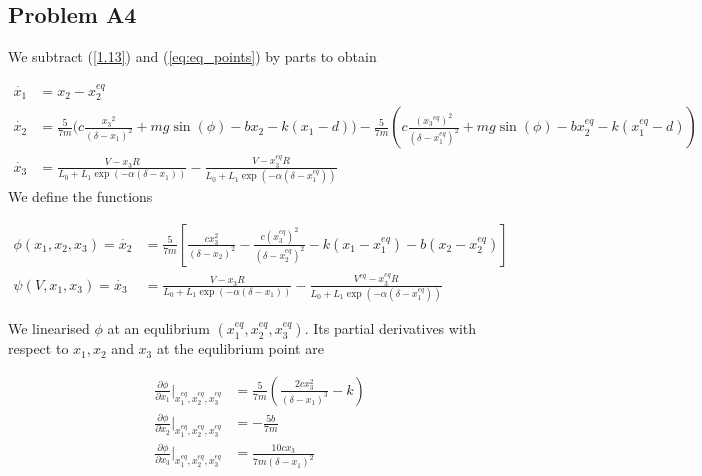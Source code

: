 \documentclass[a4paper,10pt,reqno]{amsart}
\numberwithin{equation}{section}
\begin{document}
\subsection{Problem A4}\label{sec:a4}
We subtract (\ref{1.13}) and (\ref{eq:eq_points}) by parts to obtain

\begin{subequations}
     \begin{align}
          \dot{x_1} &= x_2 - x_2^{eq} \\
          \dot{x_2} &=  \frac{5}{7m}\bigg(c \frac{{x_3}^2}{(\delta - x_1)^2} + mg\sin(\phi) - bx_2 - k(x_1-d)\bigg) - \frac{5}{7m}\left(c \frac{({x_3}^{eq})^2}{(\delta - x_1^{eq})^2} + mg\sin(\phi) - bx_2^{eq} - k(x_1^{eq}-d)\right) \label{eq:x2dot}\\
          \dot{x_3} &= \frac{V - x_3R}{L_0 + L_1\exp(-\alpha(\delta - x_1))} - \frac{V - x_3^{eq}R}{L_0 + L_1\exp(-\alpha(\delta - x_1^{eq}))} \label{eq:x3dot}
     \end{align}
\end{subequations}\newline
We define the functions

\begin{subequations}
    \begin{align}
         \phi(x_1, x_2, x_3) = \dot{x_2} &= \frac{5}{7m}\left[\frac{cx_3^2}{(\delta - x_2)^2} - \frac{c(x_3^{eq})^2}{(\delta - x_2^{eq})^2} - k(x_1 - x_1^{eq}) - b(x_2 - x_2^{eq})\right] \\
         \psi(V, x_1, x_3) = \dot{x_3} &= \frac{V - x_3R}{L_0 + L_1\exp(-\alpha(\delta - x_1))} - \frac{V^{eq} - x_3^{eq}R}{L_0 + L_1\exp(-\alpha(\delta - x_1^{eq}))}
    \end{align}
\end{subequations}

We linearised $\phi$ at an equlibrium $(x_1^{eq}, x_2^{eq}, x_3^{eq})$. Its partial derivatives with respect to $x_1, x_2$ and $x_3$ at the equlibrium point are

\begin{subequations}
     \begin{align}
          \frac{\partial\phi}{\partial x_1}\Bigg|_{x_1^{eq}, x_2^{eq}, x_3^{eq}} &= \frac{5}{7 m}\left(\frac{2 c x_{3}^{2}}{\left(\delta - x_{1}\right)^{3}} - k\right) \\
          \frac{\partial\phi}{\partial x_2}\Bigg|_{x_1^{eq}, x_2^{eq}, x_3^{eq}} &= - \frac{5 b}{7 m} \\
          \frac{\partial\phi}{\partial x_3}\Bigg|_{x_1^{eq}, x_2^{eq}, x_3^{eq}} &= \frac{10 c x_{3}}{7 m \left(\delta - x_{1}\right)^{2}}
     \end{align}
\end{subequations}
\end{document}
